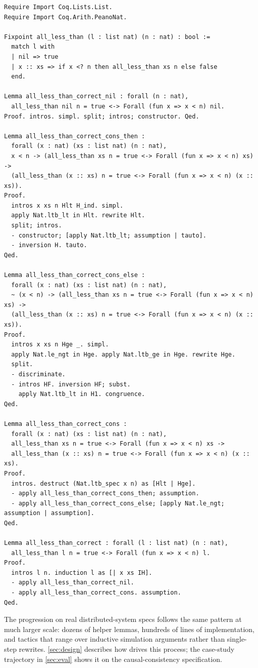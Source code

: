 \begin{lstlisting}[label={lst:state5}, caption={Step 5 (final): implementation and proof, fully verified.}]
Require Import Coq.Lists.List.
Require Import Coq.Arith.PeanoNat.

Fixpoint all_less_than (l : list nat) (n : nat) : bool :=
  match l with
  | nil => true
  | x :: xs => if x <? n then all_less_than xs n else false
  end.

Lemma all_less_than_correct_nil : forall (n : nat),
  all_less_than nil n = true <-> Forall (fun x => x < n) nil.
Proof. intros. simpl. split; intros; constructor. Qed.

Lemma all_less_than_correct_cons_then :
  forall (x : nat) (xs : list nat) (n : nat),
  x < n -> (all_less_than xs n = true <-> Forall (fun x => x < n) xs) ->
  (all_less_than (x :: xs) n = true <-> Forall (fun x => x < n) (x :: xs)).
Proof.
  intros x xs n Hlt H_ind. simpl.
  apply Nat.ltb_lt in Hlt. rewrite Hlt.
  split; intros.
  - constructor; [apply Nat.ltb_lt; assumption | tauto].
  - inversion H. tauto.
Qed.

Lemma all_less_than_correct_cons_else :
  forall (x : nat) (xs : list nat) (n : nat),
  ~ (x < n) -> (all_less_than xs n = true <-> Forall (fun x => x < n) xs) ->
  (all_less_than (x :: xs) n = true <-> Forall (fun x => x < n) (x :: xs)).
Proof.
  intros x xs n Hge _. simpl.
  apply Nat.le_ngt in Hge. apply Nat.ltb_ge in Hge. rewrite Hge.
  split.
  - discriminate.
  - intros HF. inversion HF; subst.
    apply Nat.ltb_lt in H1. congruence.
Qed.

Lemma all_less_than_correct_cons :
  forall (x : nat) (xs : list nat) (n : nat),
  all_less_than xs n = true <-> Forall (fun x => x < n) xs ->
  all_less_than (x :: xs) n = true <-> Forall (fun x => x < n) (x :: xs).
Proof.
  intros. destruct (Nat.ltb_spec x n) as [Hlt | Hge].
  - apply all_less_than_correct_cons_then; assumption.
  - apply all_less_than_correct_cons_else; [apply Nat.le_ngt; assumption | assumption].
Qed.

Lemma all_less_than_correct : forall (l : list nat) (n : nat),
  all_less_than l n = true <-> Forall (fun x => x < n) l.
Proof.
  intros l n. induction l as [| x xs IH].
  - apply all_less_than_correct_nil.
  - apply all_less_than_correct_cons. assumption.
Qed.
\end{lstlisting}

The progression on real distributed-system specs follows the same pattern at much larger scale: dozens of helper lemmas, hundreds of lines of implementation, and tactics that range over inductive simulation arguments rather than single-step rewrites. \cref{sec:design} describes how \sys{} drives this process; the case-study trajectory in \cref{sec:eval} shows it on the causal-consistency specification.
